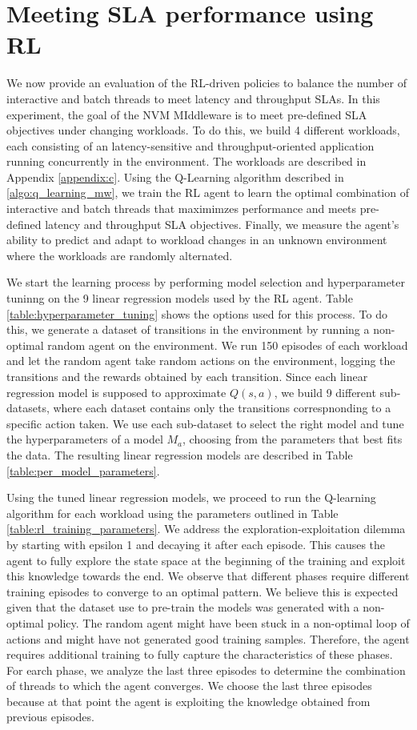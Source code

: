 \section{Meeting SLA performance using RL}
We now provide an evaluation of the RL-driven policies to balance the number of interactive and batch threads to meet latency and throughput SLAs. In this experiment, the goal of the NVM MIddleware is to meet pre-defined SLA objectives under changing workloads. To do this, we build 4 different workloads, each consisting of an latency-sensitive and throughput-oriented application running concurrently in the environment. The workloads are described in Appendix \ref{appendix:c}. Using the Q-Learning algorithm described in \ref{algo:q_learning_mw}, we train the RL agent to learn the optimal combination of interactive and batch threads that maximimzes performance and meets pre-defined latency and throughput SLA objectives. Finally, we measure the agent's ability to predict and adapt to workload changes in an unknown environment where the workloads are randomly alternated. 

We start the learning process by performing model selection and hyperparameter tuninng on the 9 linear regression models used by the RL agent. Table \ref{table:hyperparameter_tuning} shows the options used for this process. To do this, we generate a dataset of transitions in the environment by running a non-optimal random agent on the environment. We run 150 episodes of each workload and let the random agent take random actions on the environment, logging the transitions and the rewards obtained by each transition. Since each linear regression model is supposed to approximate $Q(s, a)$, we build 9 different sub-datasets, where each dataset contains only the transitions correspnonding to a specific action taken. We use each sub-dataset to select the right model and tune the hyperparameters of a model $M_a$, choosing from the parameters that best fits the data. The resulting linear regression models are described in Table \ref{table:per_model_parameters}.

Using the tuned linear regression models, we proceed to run the Q-learning algorithm for each workload using the parameters outlined in Table \ref{table:rl_training_parameters}. We address the exploration-exploitation dilemma by starting with epsilon 1 and decaying it after each episode. This causes the agent to fully explore the state space at the beginning of the training and exploit this knowledge towards the end. We observe that different phases require different training episodes to converge to an optimal pattern. We believe this is expected given that the dataset use to pre-train the models was generated with a non-optimal policy. The random agent might have been stuck in a non-optimal loop of actions and might have not generated good training samples. Therefore, the agent requires additional training to fully capture the characteristics of these phases. For earch phase, we analyze the last three episodes to determine the combination of threads to which the agent converges. We choose the last three episodes because at that point the agent is exploiting the knowledge obtained from previous episodes.

